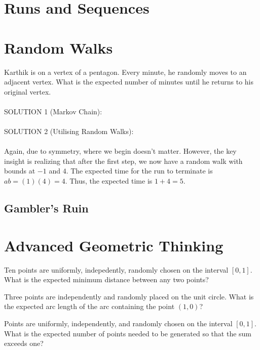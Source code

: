 \documentclass[12pt]{book}
\begin{document}
\section{Runs and Sequences}

\section{Random Walks}

\begin{propc}
Karthik is on a vertex of a pentagon. Every minute, he randomly moves to an adjacent vertex. What is the expected number of minutes until he returns to his original vertex.\\\\
SOLUTION 1 (Markov Chain): \\\\

\noindent SOLUTION 2 (Utilising Random Walks): \\\\
Again, due to symmetry, where we begin doesn't matter. However, the key insight is realizing that after the first step, we now have a random walk with bounds at $-1$ and $4$. The expected time for the run to terminate is $ab=(1)(4)=4$. Thus, the expected time is $1+4=5$.

\end{propc}

\subsection{Gambler's Ruin}

\section{Advanced Geometric Thinking}

\begin{propc}
    Ten points are uniformly, indepedently, randomly chosen on the interval $[0,1]$. What is the expected minimum distance between any two points? 
\end{propc}

\begin{propc}
    Three points are independently and randomly placed on the unit circle. What is the expected arc length of the arc containing the point $(1,0)$?
\end{propc}

\begin{propc}
    Points are uniformly, independently, and randomly chosen on the interval $[0,1]$. What is the expected number of points needed to be generated so that the sum exceeds one?
\end{propc}
\end{document}
